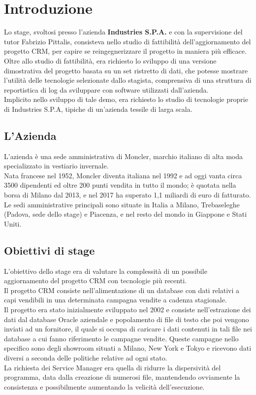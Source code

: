 \pagestyle{fancy}
\fancyhf{}
\fancyhead{}
\fancyhead[RO, LE] {\thepage}
\fancyfoot{}

\section{Introduzione}
Lo stage, svoltosi presso l'azienda \textbf{Industries S.P.A.} e con la supervisione del tutor Fabrizio Pittalis, consisteva nello studio di fattibilità dell'aggiornamento del progetto CRM, per capire se reingegnerizzare il progetto in maniera più efficace.\\
Oltre allo studio di fattibilità, era richiesto lo sviluppo di una versione dimostrativa del progetto basata su un set ristretto di dati, che potesse mostrare l'utilità delle tecnologie selezionate dallo stagista, comprensiva di una struttura di reportistica di log da sviluppare con software utilizzati dall'azienda.\\
Implicito nello sviluppo di tale demo, era richiesto lo studio di tecnologie proprie di Industries S.P.A, tipiche di un'azienda tessile di larga scala.

\subsection{L'Azienda}
L'azienda è una sede amministrativa di Moncler, marchio italiano di alta moda specializzato in vestiario invernale.\\
Nata francese nel 1952, Moncler diventa italiana nel 1992 e ad oggi vanta circa 3500 dipendenti ed oltre 200 punti vendita in tutto il mondo; è quotata nella borsa di Milano dal 2013, e nel 2017 ha superato 1,1 miliardi di euro di fatturato.\\
Le sedi amministrative principali sono situate in Italia a Milano, Trebaseleghe (Padova, sede dello stage) e Piacenza, e nel resto del mondo in Giappone e Stati Uniti.

\subsection{Obiettivi di stage}
L'obiettivo dello stage era di valutare la complessità di un possibile aggiornamento del progetto CRM con tecnologie più recenti.\\
Il progetto CRM consiste nell'alimentazione di un database con dati relativi a capi vendibili in una determinata campagna vendite a cadenza stagionale.\\
Il progetto era stato inizialmente sviluppato nel 2002 e consiste nell'estrazione dei dati dal database Oracle aziendale e popolamento di file di testo che poi vengono inviati ad un fornitore, il quale si occupa di caricare i dati contenuti in tali file nei database a cui fanno riferimento le campagne vendite. Queste campagne nello specifico sono degli showroom situati a Milano, New York e Tokyo e ricevono dati diversi a seconda delle politiche relative ad ogni stato.\\
La richiesta dei Service Manager era quella di ridurre la dispersività del programma, data dalla creazione di numerosi file, mantendendo ovviamente la consistenza e possibilmente aumentando la velicità dell'esecuzione.

